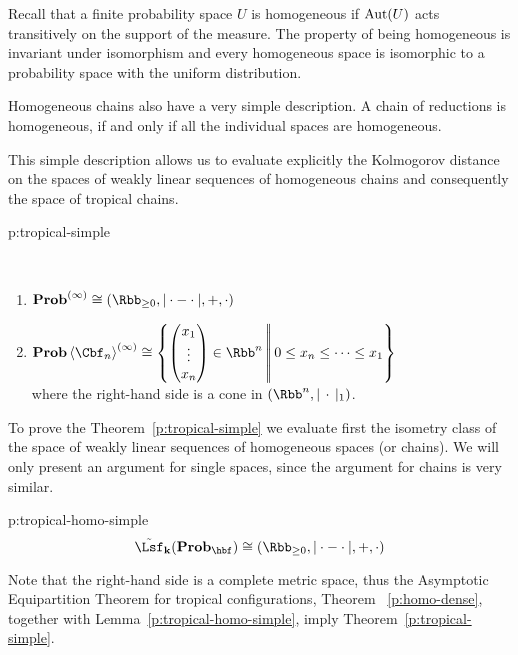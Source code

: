   Recall that a finite probability space $U$ is homogeneous if
  $\operatorname{\mathrm{Aut}}(U)$ acts transitively on the support of the measure. The property
  of being homogeneous is invariant under isomorphism and every
  homogeneous space is isomorphic to a probability space with the
  uniform distribution. 

  Homogeneous chains also have a very simple description. A chain of
  reductions is homogeneous, if and only if all the individual spaces
  are homogeneous.

  This simple description allows us to evaluate explicitly the
  Kolmogorov distance on the spaces of weakly linear sequences of
  homogeneous chains and consequently the space of tropical chains.

  \begin{theorem}{p:tropical-simple}\rule{0mm}{1mm}\\
    \begin{enumerate}
    \item 
      $\displaystyle
      \prob^{(\infty)}
      \cong
      (\Rbb_{\geq0},|\cdot - \cdot|,+,\cdot)
      $
      \vspace{3mm}
    \item 
      $\displaystyle
      \prob\<\Cbf_{n}>^{(\infty)}
      \cong
      \set{
        \left(
        \begin{matrix}
          x_{1}\\\vdots\\x_{n}
        \end{matrix}
        \right) \in\Rbb^{n} \st 0\leq x_{n}\leq \cdots\leq x_{1}} 
      $
      \vspace{3mm}
      \\ 
      where the right-hand side is a cone in $(\Rbb^{n},|\,\cdot\,|_{1})$.
    \end{enumerate}
  \end{theorem}

  To prove the Theorem~\ref{p:tropical-simple} we evaluate first
  the isometry class of the space of weakly linear sequences of
  homogeneous spaces (or chains). We will only present an argument for
  single spaces, since the argument for chains is very similar.

  \begin{lemma}{p:tropical-homo-simple}
    \[
    \tilde\lin_{\ikd}(\prob_{\hbf})
    \cong
    (\Rbb_{\geq0},|\cdot - \cdot|,+,\cdot)
    \]
  \end{lemma}

  Note that the right-hand side is a complete metric space, thus the
  Asymptotic Equipartition Theorem for tropical configurations,
  Theorem ~\ref{p:homo-dense}, together with
  Lemma~\ref{p:tropical-homo-simple}, imply
  Theorem~\ref{p:tropical-simple}.
 
